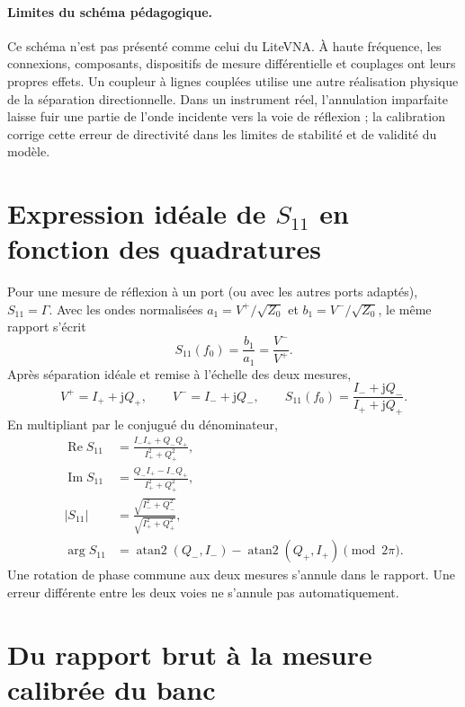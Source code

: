 \documentclass[11pt,a4paper]{article}
\newcommand{\jj}{\mathrm{j}}
\newcommand{\Reel}{\operatorname{Re}}
\begin{document}
\paragraph{Limites du schéma pédagogique.}
Ce schéma n'est pas présenté comme celui du LiteVNA. À haute fréquence,
les connexions, composants, dispositifs de mesure différentielle et
couplages ont leurs propres effets. Un coupleur à lignes couplées utilise
une autre réalisation physique de la séparation directionnelle. Dans un
instrument réel, l'annulation imparfaite laisse fuir une partie de l'onde
incidente vers la voie de réflexion ; la calibration corrige cette erreur
de directivité dans les limites de stabilité et de validité du modèle.


\section{Expression idéale de \texorpdfstring{$S_{11}$}{S11} en fonction des quadratures}
Pour une mesure de réflexion à un port (ou avec les autres ports adaptés),
$S_{11}=\Gamma$. Avec les ondes normalisées
$a_1=V^+/\sqrt{Z_0}$ et $b_1=V^-/\sqrt{Z_0}$, le même rapport s'écrit
\begin{equation}
 S_{11}(f_0)=\frac{b_1}{a_1}=\frac{V^-}{V^+}.
\end{equation}
Après séparation idéale et remise à l'échelle des deux mesures,
\begin{equation}
 V^+=I_++\jj Q_+,\qquad V^-=I_-+\jj Q_-,
 \qquad
 \boxed{S_{11}(f_0)=\frac{I_-+\jj Q_-}{I_++\jj Q_+}.}
\end{equation}
En multipliant par le conjugué du dénominateur,
\begin{align}
 \Reel S_{11}&=\frac{I_-I_++Q_-Q_+}{I_+^2+Q_+^2},\\
 \operatorname{Im}S_{11}&=\frac{Q_-I_+-I_-Q_+}{I_+^2+Q_+^2},\\
 |S_{11}|&=\frac{\sqrt{I_-^2+Q_-^2}}{\sqrt{I_+^2+Q_+^2}},\\
 \arg S_{11}&=\operatorname{atan2}(Q_-,I_-)
             -\operatorname{atan2}(Q_+,I_+)\pmod{2\pi}.
\end{align}
Une rotation de phase commune aux deux mesures s'annule dans le rapport.
Une erreur différente entre les deux voies ne s'annule pas automatiquement.

\section{Du rapport brut à la mesure calibrée du banc}
\end{document}
